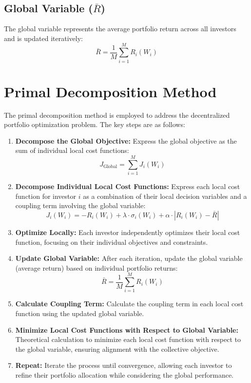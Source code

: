 \documentclass{article}
\begin{document}
	\subsection*{Global Variable ($\bar{R}$)}
	The global variable represents the average portfolio return across all investors and is updated iteratively:
	\[ \bar{R} = \frac{1}{M} \sum_{i=1}^{M} R_i(W_i) \]
	
	\section*{Primal Decomposition Method}
	
	The primal decomposition method is employed to address the decentralized portfolio optimization problem. The key steps are as follows:
	
	\begin{enumerate}
		\item \textbf{Decompose the Global Objective:} Express the global objective as the sum of individual local cost functions:
		\[ J_{\text{Global}} = \sum_{i=1}^{M} J_i(W_i) \]
		
		\item \textbf{Decompose Individual Local Cost Functions:} Express each local cost function for investor $i$ as a combination of their local decision variables and a coupling term involving the global variable:
		\[ J_i(W_i) = -R_i(W_i) + \lambda \cdot \sigma_i(W_i) + \alpha \cdot |R_i(W_i) - \bar{R}| \]
		
		\item \textbf{Optimize Locally:} Each investor independently optimizes their local cost function, focusing on their individual objectives and constraints.
		
		\item \textbf{Update Global Variable:} After each iteration, update the global variable (average return) based on individual portfolio returns:
		\[ \bar{R} = \frac{1}{M} \sum_{i=1}^{M} R_i(W_i) \]
		
		\item \textbf{Calculate Coupling Term:} Calculate the coupling term in each local cost function using the updated global variable.
		
		\item \textbf{Minimize Local Cost Functions with Respect to Global Variable:} Theoretical calculation to minimize each local cost function with respect to the global variable, ensuring alignment with the collective objective.
		
		\item \textbf{Repeat:} Iterate the process until convergence, allowing each investor to refine their portfolio allocation while considering the global performance.
	\end{enumerate}
	\pagebreak
\end{document}
